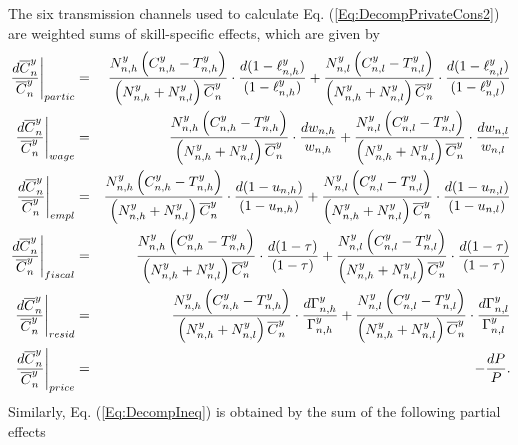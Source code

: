 \documentclass[a4paper,12pt]{article}
\begin{document}
The six transmission channels used to calculate Eq. (\ref{Eq:DecompPrivateCons2}) are weighted sums of skill-specific effects, which are given by
\begin{eqnarray*}
\left. \frac{d\overline{C}_{n}^{y}}{\overline{C}_{n}^{y}}\right \vert
_{partic} &=&\frac{N_{n,h}^{y}\left( C_{n,h}^{y}-T_{n,h}^{y}\right) }{\left(
N_{n,h}^{y}+N_{n,l}^{y}\right) \overline{C}_{n}^{y}}\cdot \frac{d(1-\ell
_{n,h}^{y})}{(1-\ell _{n,h}^{y})}+\frac{N_{n,l}^{y}\left(
C_{n,l}^{y}-T_{n,l}^{y}\right) }{\left( N_{n,h}^{y}+N_{n,l}^{y}\right) 
\overline{C}_{n}^{y}}\cdot \frac{d(1-\ell _{n,l}^{y})}{(1-\ell _{n,l}^{y})}
\\
\left. \frac{d\overline{C}_{n}^{y}}{\overline{C}_{n}^{y}}\right \vert _{wage}
&=&\frac{N_{n,h}^{y}\left( C_{n,h}^{y}-T_{n,h}^{y}\right) }{\left(
N_{n,h}^{y}+N_{n,l}^{y}\right) \overline{C}_{n}^{y}}\cdot \frac{dw_{n,h}}{%
w_{n,h}}+\frac{N_{n,l}^{y}\left( C_{n,l}^{y}-T_{n,l}^{y}\right) }{\left(
N_{n,h}^{y}+N_{n,l}^{y}\right) \overline{C}_{n}^{y}}\cdot \frac{dw_{n,l}}{%
w_{n,l}} \\
\left. \frac{d\overline{C}_{n}^{y}}{\overline{C}_{n}^{y}}\right \vert _{empl}
&=&\frac{N_{n,h}^{y}\left( C_{n,h}^{y}-T_{n,h}^{y}\right) }{\left(
N_{n,h}^{y}+N_{n,l}^{y}\right) \overline{C}_{n}^{y}}\cdot \frac{d(1-u_{n,h})%
}{(1-u_{n,h})}+\frac{N_{n,l}^{y}\left( C_{n,l}^{y}-T_{n,l}^{y}\right) }{%
\left( N_{n,h}^{y}+N_{n,l}^{y}\right) \overline{C}_{n}^{y}}\cdot \frac{%
d(1-u_{n,l})}{(1-u_{n,l})} \\
\left. \frac{d\overline{C}_{n}^{y}}{\overline{C}_{n}^{y}}\right \vert
_{fiscal} &=&\frac{N_{n,h}^{y}\left( C_{n,h}^{y}-T_{n,h}^{y}\right) }{\left(
N_{n,h}^{y}+N_{n,l}^{y}\right) \overline{C}_{n}^{y}}\cdot \frac{d(1-\tau )}{%
(1-\tau )}+\frac{N_{n,l}^{y}\left( C_{n,l}^{y}-T_{n,l}^{y}\right) }{\left(
N_{n,h}^{y}+N_{n,l}^{y}\right) \overline{C}_{n}^{y}}\cdot \frac{d(1-\tau )}{%
(1-\tau )} \\
\left. \frac{d\overline{C}_{n}^{y}}{\overline{C}_{n}^{y}}\right \vert
_{resid} &=&\frac{N_{n,h}^{y}\left( C_{n,h}^{y}-T_{n,h}^{y}\right) }{\left(
N_{n,h}^{y}+N_{n,l}^{y}\right) \overline{C}_{n}^{y}}\cdot \frac{d\Gamma
_{n,h}^{y}}{\Gamma _{n,h}^{y}}+\frac{N_{n,l}^{y}\left(
C_{n,l}^{y}-T_{n,l}^{y}\right) }{\left( N_{n,h}^{y}+N_{n,l}^{y}\right) 
\overline{C}_{n}^{y}}\cdot \frac{d\Gamma _{n,l}^{y}}{\Gamma _{n,l}^{y}} \\
\left. \frac{d\overline{C}_{n}^{y}}{\overline{C}_{n}^{y}}\right \vert
_{price} &=&-\frac{dP}{P}.
\end{eqnarray*}
Similarly, Eq. (\ref{Eq:DecompIneq}) is obtained by the sum of the following partial effects
\end{document}

